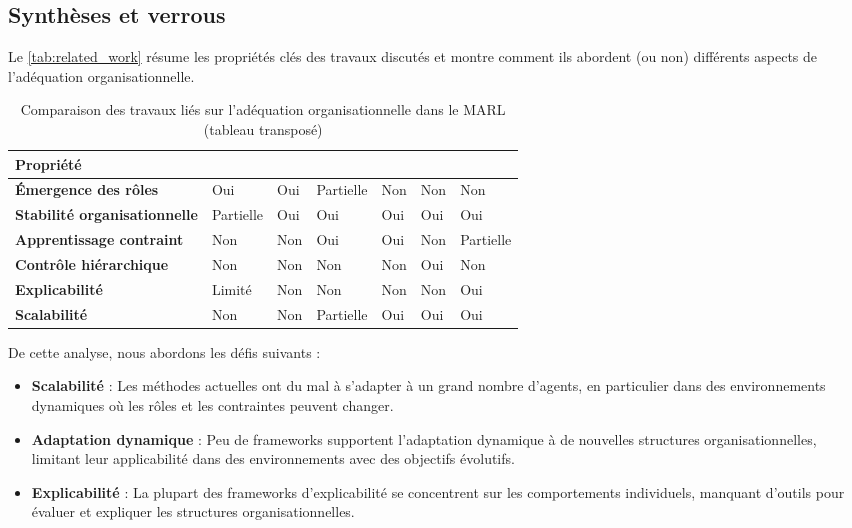 \documentclass[sigconf,anonymous]{aamas}
\begin{document}
\subsection{Synthèses et verrous}
Le \autoref{tab:related_work} résume les propriétés clés des travaux discutés et montre comment ils abordent (ou non) différents aspects de l'adéquation organisationnelle.

\begin{table}[ht]
    \centering
    \small
    \renewcommand{\arraystretch}{1.3}
    \caption{Comparaison des travaux liés sur l'adéquation organisationnelle dans le MARL (tableau transposé)}
    \label{tab:related_work}
    \begin{tabular}{m{2.1cm} >{\centering\arraybackslash}m{0.8cm} >{\centering\arraybackslash}m{0.5cm} >{\centering\arraybackslash}m{0.8cm} >{\centering\arraybackslash}m{0.5cm} >{\centering\arraybackslash}m{0.5cm} >{\centering\arraybackslash}m{0.8cm}}

        \textbf{Propriété} & \textbf{\cite{yang2021role}} & \textbf{\cite{grover2018role}} & \textbf{\cite{borsa2019constrained}} & \textbf{\cite{zhang2020safemarl}} & \textbf{\cite{ghavamzadeh2006hrl}} & \textbf{\cite{foerster2018communication}} \\
        \hline \vspace{0.2cm}
        \textbf{Émergence des rôles} & Oui & Oui & Partielle & Non & Non & Non \\
        \textbf{Stabilité organisationnelle} & Partielle & Oui & Oui & Oui & Oui & Oui \\
        \textbf{Apprentissage contraint} & Non & Non & Oui & Oui & Non & Partielle \\
        \textbf{Contrôle hiérarchique} & Non & Non & Non & Non & Oui & Non \\
        \textbf{Explicabilité} & Limité & Non & Non & Non & Non & Oui \\
        \textbf{Scalabilité} & Non & Non & Partielle & Oui & Oui & Oui
    \end{tabular}%
\end{table}

\noindent De cette analyse, nous abordons les défis suivants :
\begin{itemize}
    \item \textbf{Scalabilité} : Les méthodes actuelles ont du mal à s'adapter à un grand nombre d'agents, en particulier dans des environnements dynamiques où les rôles et les contraintes peuvent changer.
    \item \textbf{Adaptation dynamique} : Peu de frameworks supportent l'adaptation dynamique à de nouvelles structures organisationnelles, limitant leur applicabilité dans des environnements avec des objectifs évolutifs.
    \item \textbf{Explicabilité} : La plupart des frameworks d'explicabilité se concentrent sur les comportements individuels, manquant d'outils pour évaluer et expliquer les structures organisationnelles.
\end{itemize}
\end{document}
